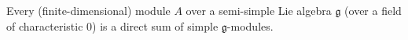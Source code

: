 Every (finite-dimensional) module $A$ over a semi-simple Lie algebra $\mathfrak{g}$ (over a field of characteristic $0$) is a direct sum of simple $\mathfrak{g}$-modules.
